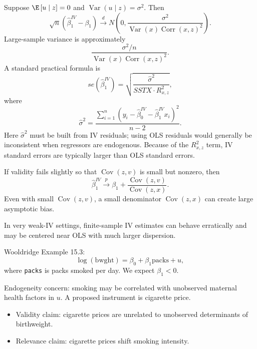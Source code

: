 \begin{proposition}
	Suppose $\E\left[u \mid z\right]=0$ and $\operatorname{Var}(u \mid z)=\sigma^2$. Then \[
		\sqrt{n}\left(\hat{\beta}_1^{IV}-\beta_1\right) \xrightarrow{d} N\left(0, \frac{\sigma^2}{\operatorname{Var}(x)\operatorname{Corr}(x,z)^2}\right)
	.\]
	Large-sample variance is approximately \[
		\frac{\sigma^2/n}{\operatorname{Var}(x)\operatorname{Corr}(x,z)^2}
	.\]
	A standard practical formula is \[
		se\left(\hat{\beta}_1^{IV}\right) = \sqrt{\frac{\hat{\sigma}^2}{SSTX \cdot R_{x,z}^2}}
	,\]
	where \[
		\hat{\sigma}^2 = \frac{\sum_{i=1}^{n}\left(y_i-\hat{\beta}_0^{IV}-\hat{\beta}_1^{IV}x_i\right)^2}{n-2}
	.\]
	Here $\hat{\sigma}^2$ must be built from IV residuals; using OLS residuals would generally be inconsistent when regressors are endogenous.
	Because of the $R_{x,z}^2$ term, IV standard errors are typically larger than OLS standard errors.
\end{proposition}

\begin{remark}
	If validity fails slightly so that $\operatorname{Cov}(z,v)$ is small but nonzero, then \[
		\hat{\beta}_1^{IV} \xrightarrow{p} \beta_1 + \frac{\operatorname{Cov}(z,v)}{\operatorname{Cov}(z,x)}
	.\]
	Even with small $\operatorname{Cov}(z,v)$, a small denominator $\operatorname{Cov}(z,x)$ can create large asymptotic bias.

	In very weak-IV settings, finite-sample IV estimates can behave erratically and may be centered near OLS with much larger dispersion.
\end{remark}

\begin{example}
	Wooldridge Example 15.3: \[
		\log(\text{bwght}) = \beta_0 + \beta_1\text{packs} + u
	,\]
	where \texttt{packs} is packs smoked per day. We expect $\beta_1<0$.

	Endogeneity concern: smoking may be correlated with unobserved maternal health factors in $u$. A proposed instrument is cigarette price.
	\begin{itemize}
		\item Validity claim: cigarette prices are unrelated to unobserved determinants of birthweight.
		\item Relevance claim: cigarette prices shift smoking intensity.
	\end{itemize}
\end{example}

